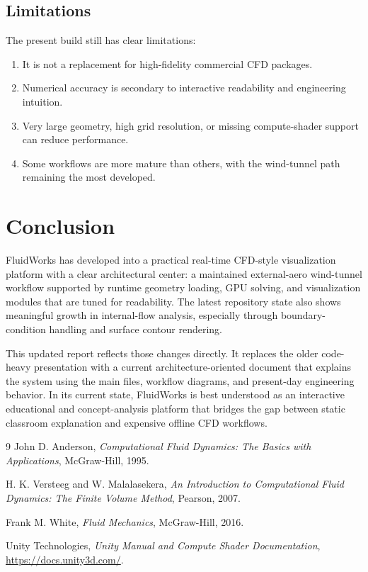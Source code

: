 \documentclass[12pt,a4paper,titlepage]{report}
\begin{document}
\section{Limitations}
The present build still has clear limitations:
\begin{enumerate}
\item It is not a replacement for high-fidelity commercial CFD packages.
\item Numerical accuracy is secondary to interactive readability and engineering intuition.
\item Very large geometry, high grid resolution, or missing compute-shader support can reduce performance.
\item Some workflows are more mature than others, with the wind-tunnel path remaining the most developed.
\end{enumerate}

\chapter{Conclusion}
FluidWorks has developed into a practical real-time CFD-style visualization platform with a clear architectural center: a maintained external-aero wind-tunnel workflow supported by runtime geometry loading, GPU solving, and visualization modules that are tuned for readability. The latest repository state also shows meaningful growth in internal-flow analysis, especially through boundary-condition handling and surface contour rendering.

This updated report reflects those changes directly. It replaces the older code-heavy presentation with a current architecture-oriented document that explains the system using the main files, workflow diagrams, and present-day engineering behavior. In its current state, FluidWorks is best understood as an interactive educational and concept-analysis platform that bridges the gap between static classroom explanation and expensive offline CFD workflows.

\begin{thebibliography}{9}
John D. Anderson,
\textit{Computational Fluid Dynamics: The Basics with Applications},
McGraw-Hill, 1995.

H. K. Versteeg and W. Malalasekera,
\textit{An Introduction to Computational Fluid Dynamics: The Finite Volume Method},
Pearson, 2007.

Frank M. White,
\textit{Fluid Mechanics},
McGraw-Hill, 2016.

Unity Technologies,
\textit{Unity Manual and Compute Shader Documentation},
\url{https://docs.unity3d.com/}.
\end{thebibliography}
\end{document}

